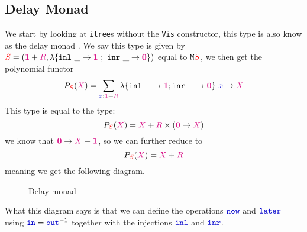 \documentclass[twoside,11pt,openright]{report}
\newcommand*{\term}[1]{\textcolor{blue!80!black}{#1}}
\newcommand*{\type}[1]{\textcolor{magenta!90!black}{#1}}
\newcommand*{\container}[1]{\textcolor{red}{#1}}
\newcommand*{\unit}{\type{\textbf{1}}}
\newcommand*{\empt}{\type{\textbf{0}}}
\begin{document}
\subsection{Delay Monad}
We start by looking at \texttt{itree}s without the \texttt{Vis} constructor, this type is also know as the delay monad . We say this type is given by \(\container{S} = (\unit + \type{R},\lambda \{ \texttt{inl}~\_ \rightarrow \unit~;~\texttt{inr}~\_ \rightarrow \empt \})\) equal to \(\mathtt{M}\container{S}\), we then get the polynomial functor
\begin{equation}
  P_{\container{S}}(\type{X}) = \sum_{\term{x} : \unit + \type{R}} \lambda \{ \texttt{inl}~\_ \rightarrow \unit ; \texttt{inr}~\_ \rightarrow \empt\}~\term{x} \rightarrow \type{X}
\end{equation}
This type is equal to the type:
\begin{equation}
  P_{\container{S}}(\type{X}) = \type{X} + \type{R} \times (\empt \rightarrow \type{X})
\end{equation}
we know that \(\empt \rightarrow \type{X} \equiv \unit\), so we can further reduce to
\begin{equation}
  P_{\container{S}}(\type{X}) = \type{X} + \type{R}
\end{equation}
meaning we get the following diagram.
\begin{figure}[h]
  \centering
  \caption{Delay monad}
\end{figure}
What this diagram says is that we can define the operations \(\term{\mathtt{now}}\) and \(\term{\mathtt{later}}\) using \(\term{\mathtt{in}} = \term{\mathtt{out}}^{-1}\) together with the injections \(\term{\mathtt{inl}}\) and \(\term{\mathtt{inr}}\). 
\end{document}
